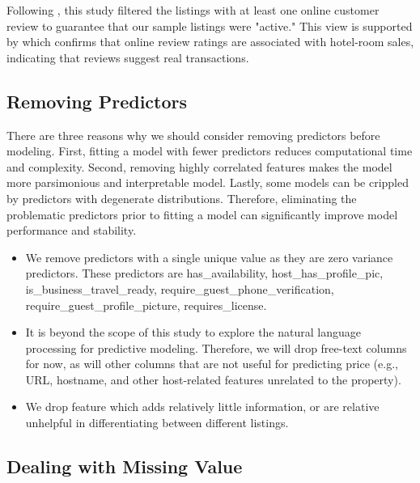 Following \textcite{wang2017price}, this study filtered the listings with at
least one online customer review to guarantee that our sample listings were
"active." This view is supported by \textcite{ye2009impact}  which confirms that online
review ratings are associated with hotel-room sales, indicating that reviews
suggest real transactions.

\subsection{Removing Predictors}

There are three reasons why we should consider removing predictors before
modeling. First, fitting a model with fewer predictors reduces computational
time and complexity. Second, removing highly correlated features makes the model
more parsimonious and interpretable model.  Lastly, some models can be crippled
by predictors with degenerate distributions.  Therefore, eliminating the
problematic predictors prior to fitting a model can significantly improve model
performance and stability.
\begin{itemize}

    \item We remove  predictors with a single unique value as they are  zero
        variance predictors. These predictors are has\_availability,
        host\_has\_profile\_pic, is\_business\_travel\_ready,
        require\_guest\_phone\_verification, require\_guest\_profile\_picture,
        requires\_license.

    \item It is beyond the scope of this study to explore the natural language
        processing for predictive modeling.  Therefore,  we will drop free-text
        columns for now, as will other columns that are not useful for
        predicting price (e.g., URL, hostname, and other host-related features
        unrelated to the property).

    \item We drop feature which  adds relatively little information, or are
        relative unhelpful in differentiating between different listings.

\end{itemize}

\subsection{Dealing with Missing Value}

